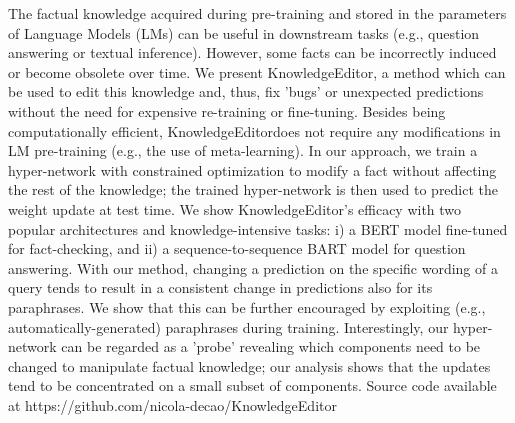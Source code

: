 The factual knowledge acquired during pre-training and stored in the parameters of Language Models (LMs) can be useful in downstream tasks (e.g., question answering or textual inference). However, some facts can be incorrectly induced or become obsolete over time. We present KnowledgeEditor, a method which can be used to edit this knowledge and, thus, fix 'bugs' or unexpected predictions without the need for expensive re-training or fine-tuning. Besides being computationally efficient, KnowledgeEditordoes not require any modifications in LM pre-training (e.g., the use of meta-learning). In our approach, we train a hyper-network with constrained optimization to modify a fact without affecting the rest of the knowledge; the trained hyper-network is then used to predict the weight update at test time. We show KnowledgeEditor's efficacy with two popular architectures and knowledge-intensive tasks: i) a BERT model fine-tuned for fact-checking, and ii) a sequence-to-sequence BART model for question answering. With our method, changing a prediction on the specific wording of a query tends to result in a consistent change in predictions also for its paraphrases. We show that this can be further encouraged by exploiting (e.g., automatically-generated) paraphrases during training. Interestingly, our hyper-network can be regarded as a 'probe' revealing which components need to be changed to manipulate factual knowledge; our analysis shows that the updates tend to be concentrated on a small subset of components. Source code available at https://github.com/nicola-decao/KnowledgeEditor
